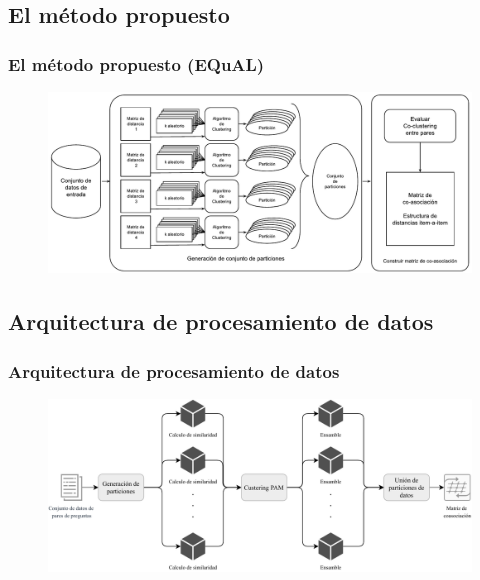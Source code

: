\subsection{El método propuesto}
\begin{frame}
	\frametitle{El método propuesto (EQuAL)}
	\begin{figure}
		\centering
		\includegraphics[width=0.9\linewidth]{../8_problema_investigacion/imagenes/metodo_equal}
		\label{fig:metodoequal}
	\end{figure}
\end{frame}

\subsection{Arquitectura de procesamiento de datos}
\begin{frame}
	\frametitle{Arquitectura de procesamiento de datos}
	\begin{figure}
		\centering
		\includegraphics[width=0.9\linewidth]{../8_problema_investigacion/imagenes/equal_distribuido}
		\label{fig:equaldistribuido}
	\end{figure}
\end{frame}

